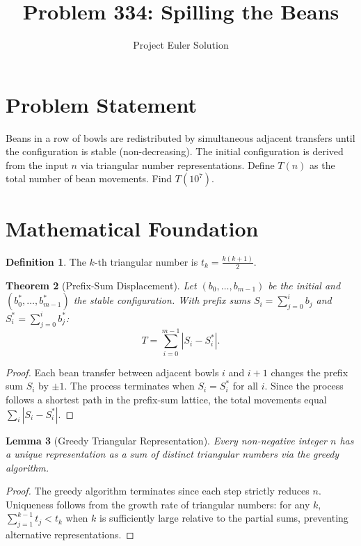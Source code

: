 \documentclass[12pt]{article}
\title{Problem 334: Spilling the Beans}
\author{Project Euler Solution}
\date{}
\newtheorem{theorem}{Theorem}
\newtheorem{lemma}[theorem]{Lemma}
\theoremstyle{definition}
\newtheorem{definition}[theorem]{Definition}
\begin{document}
\maketitle

\section{Problem Statement}

Beans in a row of bowls are redistributed by simultaneous adjacent transfers until the configuration is stable (non-decreasing). The initial configuration is derived from the input $n$ via triangular number representations. Define $T(n)$ as the total number of bean movements. Find $T(10^7)$.

\section{Mathematical Foundation}

\begin{definition}
The $k$-th triangular number is $t_k = \frac{k(k+1)}{2}$.
\end{definition}

\begin{theorem}[Prefix-Sum Displacement]
Let $(b_0, \ldots, b_{m-1})$ be the initial and $(b_0^*, \ldots, b_{m-1}^*)$ the stable configuration. With prefix sums $S_i = \sum_{j=0}^{i} b_j$ and $S_i^* = \sum_{j=0}^{i} b_j^*$:
\[
T = \sum_{i=0}^{m-1} |S_i - S_i^*|.
\]
\end{theorem}

\begin{proof}
Each bean transfer between adjacent bowls $i$ and $i+1$ changes the prefix sum $S_i$ by $\pm 1$. The process terminates when $S_i = S_i^*$ for all $i$. Since the process follows a shortest path in the prefix-sum lattice, the total movements equal $\sum_i |S_i - S_i^*|$.
\end{proof}

\begin{lemma}[Greedy Triangular Representation]
Every non-negative integer $n$ has a unique representation as a sum of distinct triangular numbers via the greedy algorithm.
\end{lemma}

\begin{proof}
The greedy algorithm terminates since each step strictly reduces $n$. Uniqueness follows from the growth rate of triangular numbers: for any $k$, $\sum_{j=1}^{k-1} t_j < t_k$ when $k$ is sufficiently large relative to the partial sums, preventing alternative representations.
\end{proof}
\end{document}
